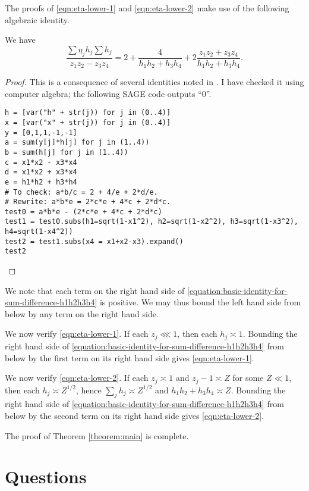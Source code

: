 \documentclass[reqno]{amsart} 
\begin{document}
The proofs of \eqref{eqn:eta-lower-1} and \eqref{eqn:eta-lower-2} make use of the following algebraic identity.
\begin{lemma}\label{lemma:algebraic-identity}
  We have
  \begin{equation}\label{equation:basic-identity-for-sum-difference-h1h2h3h4}
  \frac{\sum \eta_j h_j \sum h_j
  }{
    z _1 z _2 - z _3 z _4 
  }
  =
  2 + \frac{4}{ h _1 h _2 + h _3 h _4 }
  + 2 \frac{z _1 z _2 + z _3 z _4 }{ h _1 h _2 + h _3 h _4}.
\end{equation}
\end{lemma}
\begin{proof}
  This is a consequence of several identities noted in \cite{ki20234}.  I have checked it using computer algebra; the following SAGE code outputs ``$0$''.
\begin{verbatim}
h = [var("h" + str(j)) for j in (0..4)]
x = [var("x" + str(j)) for j in (0..4)]
y = [0,1,1,-1,-1]
a = sum(y[j]*h[j] for j in (1..4))
b = sum(h[j] for j in (1..4))
c = x1*x2 - x3*x4
d = x1*x2 + x3*x4
e = h1*h2 + h3*h4
# To check: a*b/c = 2 + 4/e + 2*d/e.
# Rewrite: a*b*e = 2*c*e + 4*c + 2*d*c.
test0 = a*b*e - (2*c*e + 4*c + 2*d*c)
test1 = test0.subs(h1=sqrt(1-x1^2), h2=sqrt(1-x2^2), h3=sqrt(1-x3^2), h4=sqrt(1-x4^2))
test2 = test1.subs(x4 = x1+x2-x3).expand()
test2
\end{verbatim}
\end{proof}
We note that each term on the right hand side of \eqref{equation:basic-identity-for-sum-difference-h1h2h3h4} is positive.  We may thus bound the left hand side from below by any term on the right hand side.

We now verify \eqref{eqn:eta-lower-1}.  If each $z_j \lll 1$, then each $h_j \asymp 1$.  Bounding the right hand side of \eqref{equation:basic-identity-for-sum-difference-h1h2h3h4} from below by the first term on its right hand side gives \eqref{eqn:eta-lower-1}.

We now verify \eqref{eqn:eta-lower-2}.  If each $z_j \asymp 1$ and $z_j - 1 \asymp Z$ for some $Z \ll 1$, then each $h_j \asymp Z ^{1/2}$, hence $\sum_j h_j \asymp Z^{1/2}$ and $h_1 h_2 + h_3 h_4 \asymp Z$.  Bounding the right hand side of \eqref{equation:basic-identity-for-sum-difference-h1h2h3h4} from below by the second term on its right hand side gives \eqref{eqn:eta-lower-2}.

The proof of Theorem \ref{theorem:main} is complete.

\section{Questions}\label{sec:cqx50a0dcx}
\end{document}
